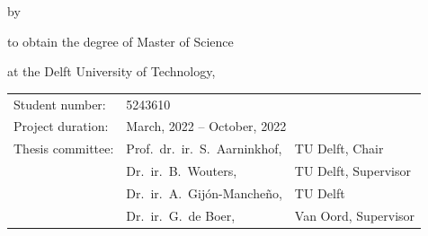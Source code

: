 \begin{titlepage}


    \begin{center}


        {\makeatletter
            \largetitlestyle\fontsize{48}{94}\selectfont\@title
            \makeatother}

        {\makeatletter
            \ifx\@subtitle\undefined\else
                \bigskip
                {\tudsffamily\fontsize{22}{32}\selectfont\@subtitle}
            \fi
            \makeatother}

        \bigskip
        \bigskip

        by

        \bigskip
        \bigskip

        {\makeatletter
            \largetitlestyle\fontsize{26}{26}\selectfont\@author
            \makeatother}

        \bigskip
        \bigskip

        to obtain the degree of Master of Science

        at the Delft University of Technology,


        \vfill
        \begin{tabular}{lll}
            Student number:   & 5243610                                                       \\
            Project duration: & \multicolumn{2}{l}{March, 2022 -- October, 2022}                        \\
            Thesis committee: & Prof.\ dr.\ ir.\ S.\ Aarninkhof,       & TU Delft, Chair      \\
                              & Dr.\ ir.\ B.\ Wouters,                 & TU Delft, Supervisor \\
                              & Dr.\ ir.\ A.\ Gijón-Mancheño,          & TU Delft             \\
                              & Dr.\ ir.\ G.\ de Boer,                 & Van Oord, Supervisor
        \end{tabular}


\end{center}
\end{titlepage}
